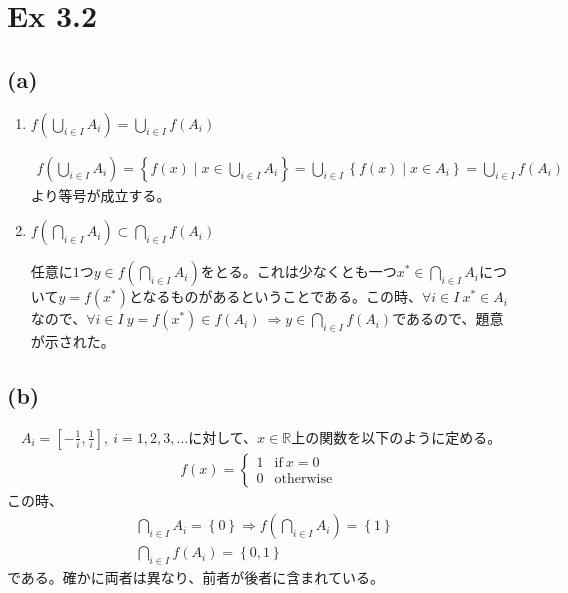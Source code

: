 \documentclass{article}
\begin{document}
\section{Ex 3.2}
\subsection{(a)}
\begin{enumerate}
	\item $f\left( \bigcup_{i \in I} A_i \right) = \bigcup_{i\in I} f\left( A_i \right)$
	
	\begin{align*}
		f\left( \bigcup_{i \in I} A_i \right) = \left\{ f(x)\mid x \in \bigcup_{i \in I } A_i \right\} = \bigcup_{i\in I} \left\{ f(x)\mid x \in A_i \right\} = \bigcup_{i\in I} f\left( A_i \right)
	\end{align*}
	より等号が成立する。
	
	\item $f\left( \bigcap_{i \in I} A_i \right) \subset \bigcap_{i\in I} f\left( A_i \right)$
	
	任意に$1$つ$y \in f\left( \bigcap_{i \in I} A_i \right)$をとる。これは少なくとも一つ$x^* \in \bigcap_{i \in I} A_i$について$y = f(x^*)$となるものがあるということである。この時、$\forall i \in I\ x^* \in A_i$なので、$\forall i\in I\ y = f(x^*)\in f\left( A_i \right)\ \Rightarrow y \in \bigcap_{i \in I} f\left( A_i \right)$であるので、題意が示された。
\end{enumerate}

\subsection{(b)}
　$A_i = \left[ -\frac{1}{i}, \frac{1}{i} \right],\ i = 1,2,3,\dots$に対して、$x \in \mathbb{R}$上の関数を以下のように定める。
\begin{align*}
	f(x) = \begin{cases}
	1 & \text{if}\ x = 0 \\
	0 & \text{otherwise}
	\end{cases}
\end{align*}
この時、
\begin{align*}
	&\bigcap_{i\in I} A_i = \left\{ 0 \right\} \Rightarrow f\left( \bigcap_{i\in I} A_i \right) = \left\{ 1 \right\} \\
	&\bigcap_{i \in I} f\left( A_i \right) = \left\{ 0,1 \right\}
\end{align*}
である。確かに両者は異なり、前者が後者に含まれている。
\end{document}
